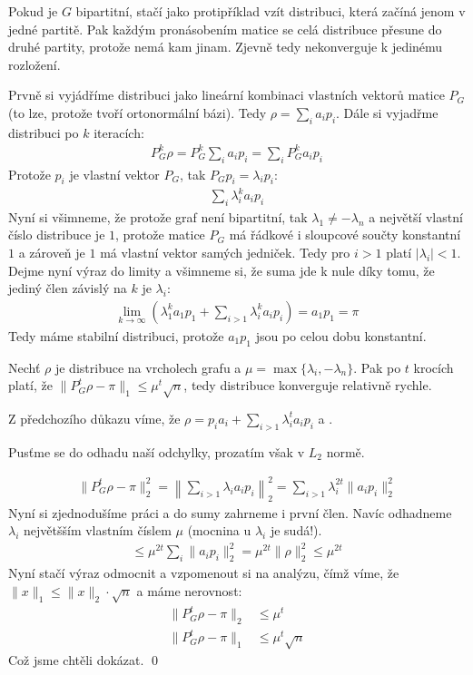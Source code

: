 \dk \begin{description}
	\item \uv{$\Rightarrow$} Pokud je $G$ bipartitní, stačí jako protipříklad vzít distribuci, která začíná jenom v jedné partitě. Pak každým pronásobením matice se celá distribuce přesune do druhé partity, protože nemá kam jinam. Zjevně tedy nekonverguje k jedinému rozložení.
	\item \uv{$\Leftarrow$} Prvně si vyjádříme distribuci jako lineární kombinaci vlastních vektorů matice $P_G$ (to lze, protože tvoří ortonormální bázi). Tedy $\rho = \sum_i a_ip_i$. Dále si vyjadřme distribuci po $k$ iteracích:
	\begin{align}
		P_G^k\rho = P_G^k\sum_ia_ip_i = \sum_iP_G^ka_ip_i
	\end{align}
	Protože $p_i$ je vlastní vektor $P_G$, tak $P_Gp_i = \lambda_ip_i$:
	\begin{align}
		\sum_i\lambda_i^ka_ip_i
	\end{align}
	Nyní si všimneme, že protože graf není bipartitní, tak $\lambda_1 \neq -\lambda_n$ a největší vlastní číslo distribuce je $1$, protože matice $P_G$ má řádkové i sloupcové součty konstantní $1$ a zároveň je $1$ má vlastní vektor samých jedniček. Tedy pro $i > 1$ platí $|\lambda_i| < 1$. Dejme nyní výraz do limity a všimneme si, že suma jde k nule díky tomu, že jediný člen závislý na $k$ je $\lambda_i$:
	\begin{align}
		\lim_{k\to \infty}\left(\lambda_1^ka_1p_1 + \sum_{i>1}\lambda_i^ka_ip_i\right) = a_1p_1 = \pi
	\end{align}
	Tedy máme stabilní distribuci, protože $a_1p_1$ jsou po celou dobu konstantní.
\end{description}

\vt Nechť $\rho$ je distribuce na vrcholech grafu a $\mu=\max\{\lambda_i,-\lambda_n\}$. Pak po $t$ krocích platí, že $\|P_G^t\rho - \pi\|_1 \leq \mu^t\sqrt{n}$, tedy distribuce konverguje relativně rychle.

\dk Z předchozího důkazu víme, že $\rho = p_ia_i + \sum_{i>1} \lambda_i^ta_ip_i$ a .

Pusťme se do odhadu naší odchylky, prozatím však v $L_2$ normě.

\begin{align}
	\|P_G^t\rho - \pi\|_2^2 = \left\|\sum_{i > 1} \lambda_ia_ip_i\right\|_2^2 = \sum_{i>1}\lambda_i^{2t}\|a_ip_i\|_2^2
\end{align}
Nyní si zjednodušíme práci a do sumy zahrneme i první člen. Navíc odhadneme $\lambda_i$ největšším vlastním číslem $\mu$ (mocnina u $\lambda_i$ je sudá!).
\begin{align}
	\leq \mu^{2t}\sum_i\|a_ip_i\|_2^2 = \mu^{2t}\|\rho\|_2^2 \leq \mu^{2t}
\end{align}
Nyní stačí výraz odmocnit a vzpomenout si na analýzu, čímž víme, že $\|x\|_1 \leq \|x\|_2 \cdot \sqrt n$ a máme nerovnost:
\begin{align}
	\|P_G^t\rho - \pi\|_2 &\leq \mu^{t} \\
	\|P_G^t\rho - \pi\|_1 &\leq \mu^{t} \sqrt n
\end{align}
Což jsme chtěli dokázat. \qed

